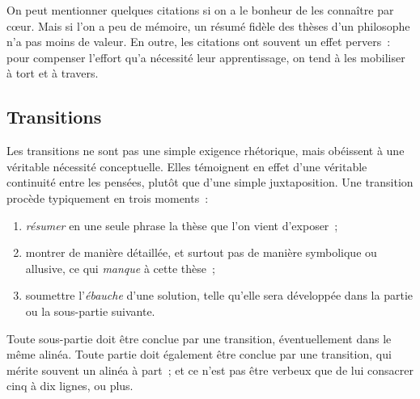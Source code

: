 \documentclass[a4paper,11pt]{article}
\begin{document}
\par

On peut mentionner quelques citations si on a le bonheur de les
connaître par cœur. Mais si l'on a peu de mémoire, un résumé fidèle des
thèses d'un philosophe n'a pas moins de valeur. En outre, les citations
ont souvent un effet pervers~: pour compenser l'effort qu'a nécessité
leur apprentissage, on tend à les mobiliser à tort et à travers.


\subsection{Transitions}

Les transitions ne sont pas une simple exigence rhétorique, mais
obéissent à une véritable nécessité conceptuelle. Elles témoignent en
effet d'une véritable continuité entre les pensées, plutôt que d'une
simple juxtaposition. Une transition procède typiquement en trois
moments~:
\begin{enumerate}
\item \emph{résumer} en une seule phrase la thèse que l'on vient
  d'exposer~;
\item montrer de manière détaillée, et surtout pas de manière symbolique
  ou allusive, ce qui \emph{manque} à cette thèse~;
\item soumettre l'\emph{ébauche} d'une solution, telle qu'elle sera
  développée dans la partie ou la sous-partie suivante.
\end{enumerate}

\par

Toute sous-partie doit être conclue par une transition, éventuellement
dans le même alinéa. Toute partie doit également être conclue par une
transition, qui mérite souvent un alinéa à part~; et ce n'est pas être
verbeux que de lui consacrer cinq à dix lignes, ou plus.

\par
\end{document}
